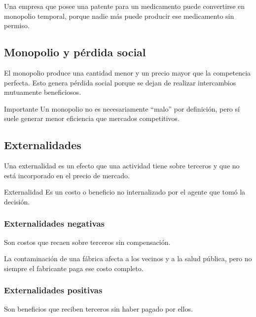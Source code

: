 \begin{ejemplo}
Una empresa que posee una patente para un medicamento puede convertirse en monopolio temporal, porque nadie más puede producir ese medicamento sin permiso.
\end{ejemplo}

\subsection{Monopolio y pérdida social}

El monopolio produce una cantidad menor y un precio mayor que la competencia perfecta. Esto genera pérdida social porque se dejan de realizar intercambios mutuamente beneficiosos.

\begin{observacion}{Importante}
Un monopolio no es necesariamente “malo” por definición, pero sí suele generar menor eficiencia que mercados competitivos.
\end{observacion}

\subsection{Externalidades}

Una externalidad es un efecto que una actividad tiene sobre terceros y que no está incorporado en el precio de mercado.

\begin{concepto}{Externalidad}
Es un costo o beneficio no internalizado por el agente que tomó la decisión.
\end{concepto}

\subsubsection{Externalidades negativas}

Son costos que recaen sobre terceros sin compensación.

\begin{ejemplo}
La contaminación de una fábrica afecta a los vecinos y a la salud pública, pero no siempre el fabricante paga ese costo completo.
\end{ejemplo}

\subsubsection{Externalidades positivas}

Son beneficios que reciben terceros sin haber pagado por ellos.

